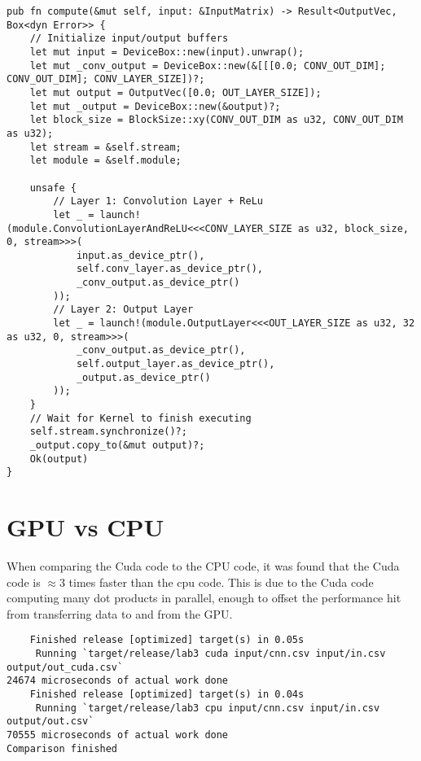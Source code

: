 \documentclass[12pt]{article}
\begin{document}
\begin{verbatim}
pub fn compute(&mut self, input: &InputMatrix) -> Result<OutputVec, Box<dyn Error>> {
    // Initialize input/output buffers
    let mut input = DeviceBox::new(input).unwrap();
    let mut _conv_output = DeviceBox::new(&[[[0.0; CONV_OUT_DIM]; CONV_OUT_DIM]; CONV_LAYER_SIZE])?;
    let mut output = OutputVec([0.0; OUT_LAYER_SIZE]);
    let mut _output = DeviceBox::new(&output)?;
    let block_size = BlockSize::xy(CONV_OUT_DIM as u32, CONV_OUT_DIM as u32);
    let stream = &self.stream;
    let module = &self.module;

    unsafe {
        // Layer 1: Convolution Layer + ReLu
        let _ = launch!(module.ConvolutionLayerAndReLU<<<CONV_LAYER_SIZE as u32, block_size, 0, stream>>>(
            input.as_device_ptr(),
            self.conv_layer.as_device_ptr(),
            _conv_output.as_device_ptr()
        ));
        // Layer 2: Output Layer
        let _ = launch!(module.OutputLayer<<<OUT_LAYER_SIZE as u32, 32 as u32, 0, stream>>>(
            _conv_output.as_device_ptr(),
            self.output_layer.as_device_ptr(),
            _output.as_device_ptr()
        ));
    }
    // Wait for Kernel to finish executing
    self.stream.synchronize()?;
    _output.copy_to(&mut output)?;
    Ok(output)
}
\end{verbatim}

\section{GPU vs CPU}
When comparing the Cuda code to the CPU code, it was found that the Cuda code is $\approx 3$ times faster than the cpu code. This is due to the Cuda code computing many dot products in parallel, enough to offset the performance hit from transferring data to and from the GPU.

\begin{verbatim}
    Finished release [optimized] target(s) in 0.05s
     Running `target/release/lab3 cuda input/cnn.csv input/in.csv output/out_cuda.csv`
24674 microseconds of actual work done
    Finished release [optimized] target(s) in 0.04s
     Running `target/release/lab3 cpu input/cnn.csv input/in.csv output/out.csv`
70555 microseconds of actual work done
Comparison finished
\end{verbatim}
\end{document}
